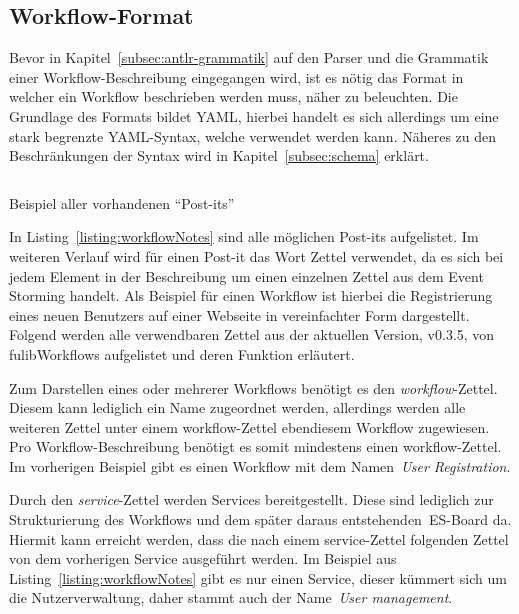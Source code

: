 \subsection{Workflow-Format}\label{subsec:workflow-format}
Bevor in Kapitel~\ref{subsec:antlr-grammatik} auf den Parser und die Grammatik einer Workflow-Beschreibung eingegangen wird,
ist es nötig das Format in welcher ein Workflow beschrieben werden muss, näher zu beleuchten.
Die Grundlage des Formats bildet \ac{YAML}, hierbei handelt es sich allerdings um eine stark begrenzte YAML-Syntax, welche verwendet werden kann.
Näheres zu den Beschränkungen der Syntax wird in Kapitel~\ref{subsec:schema} erklärt.

\begin{listing}[!ht]
    \inputminted{yaml}{listings/3.1.1/allNotes.es.yaml}
    \caption{Beispiel aller vorhandenen ``Post-its''}
    \label{listing:workflowNotes}
\end{listing}

In Listing~\ref{listing:workflowNotes} sind alle möglichen Post-its aufgelistet.
Im weiteren Verlauf wird für einen Post-it das Wort Zettel verwendet, da es sich bei jedem Element in der Beschreibung um einen einzelnen Zettel aus dem Event Storming handelt.
Als Beispiel für einen Workflow ist hierbei die Registrierung eines neuen Benutzers auf einer Webseite in vereinfachter Form dargestellt.
Folgend werden alle verwendbaren Zettel aus der aktuellen Version, v0.3.5, von fulibWorkflows aufgelistet und deren Funktion erläutert.


Zum Darstellen eines oder mehrerer Workflows benötigt es den \textit{workflow}-Zettel.
Diesem kann lediglich ein Name zugeordnet werden, allerdings werden alle weiteren Zettel unter einem workflow-Zettel ebendiesem Workflow zugewiesen.
Pro Workflow-Beschreibung benötigt es somit mindestens einen workflow-Zettel.
Im vorherigen Beispiel gibt es einen Workflow mit dem Namen~\textit{User Registration}.


Durch den \textit{service}-Zettel werden Services bereitgestellt.
Diese sind lediglich zur Strukturierung des Workflows und dem später daraus entstehenden~\ac{ES}-Board da.
Hiermit kann erreicht werden, dass die nach einem service-Zettel folgenden Zettel von dem vorherigen Service ausgeführt werden.
Im Beispiel aus Listing~\ref{listing:workflowNotes} gibt es nur einen Service, dieser kümmert sich um die Nutzerverwaltung, daher
stammt auch der Name~\textit{User management}.


